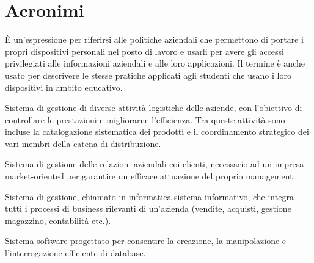 {}
\section*{Acronimi}
\begin{acronym}[DBMS]
	
	{\small È un'espressione per riferirsi alle politiche aziendali che permettono di portare i propri dispositivi personali nel posto di lavoro e usarli per avere gli accessi privilegiati alle informazioni aziendali e alle loro applicazioni. Il termine è anche usato per descrivere le stesse pratiche applicati agli studenti che usano i loro dispositivi in ambito educativo. \par}

	
	{\small Sistema di gestione di diverse attività logistiche delle aziende, con l'obiettivo di controllare le prestazioni e migliorarne l'efficienza. Tra queste attività sono incluse la catalogazione sistematica dei prodotti e il coordinamento strategico dei vari membri della catena di distribuzione. \par}

	
	{\small Sistema di gestione delle relazioni aziendali coi clienti, necessario ad un impresa market-oriented per garantire un efficace attuazione del proprio management. \par}

	
	{\small Sistema di gestione, chiamato in informatica sistema informativo, che integra tutti i processi di business rilevanti di un'azienda (vendite, acquisti, gestione magazzino, contabilità etc.). \par}

	
	{\small  Sistema software progettato per consentire la creazione, la manipolazione e l'interrogazione efficiente  di database. \par}

    	

\end{acronym}
